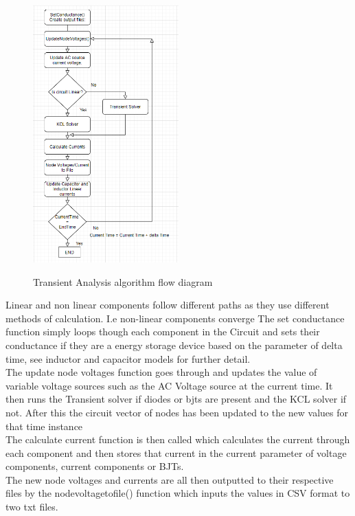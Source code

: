 \documentclass{article}
\begin{document}
\begin{figure}[H]
\centering
\includegraphics[width =0.5\textwidth]{ images/TranAna.PNG}
\label{fig:TranAna} 
\caption{Transient Analysis algorithm flow diagram}
\end{figure}
Linear and non linear components follow different paths as they use different methods of calculation. I.e non-linear components converge
\smallbreak
The set conductance function simply loops though each component in the Circuit and sets their conductance if they are a energy storage device based on the parameter of delta time, see inductor and capacitor models for further detail.\\
The update node voltages function goes through and updates the value of variable voltage sources such as the AC Voltage source at the current time. It then runs the Transient solver if diodes or bjts are present and the KCL solver if not. 
After this the circuit vector of nodes has been updated to the new values for that time instance\\
The calculate current function is then called which calculates the current through each component and then stores that current in the current parameter of voltage components, current components or BJTs.   \\
The new node voltages and currents are all then outputted to their respective files by the nodevoltagetofile()  function which inputs the values in CSV format to two txt files.\\
\end{document}
